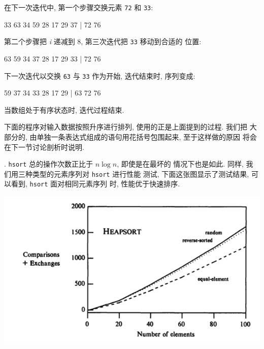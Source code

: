 在下一次迭代中, 第一个步骤交换元素 \texttt{72} 和 \texttt{33}:
\begin{file}
    33 63 34 59 28 17 29 37 | 72 76
\end{file}
第二个步骤把 \textit{i} 递减到 8, 第三次迭代把 \texttt{33} 移动到合适的 
位置:
\begin{file}
    63 59 34 37 28 17 29 33 | 72 76
\end{file}
下一次迭代以交换 \verb'63' 与 \verb'33' 作为开始, 迭代结束时, 序列变成:
\begin{file}
    59 37 34 33 28 17 29 | 63 72 76
\end{file}
当数组处于有序状态时, 迭代过程结束.

下面的程序对输入数据按照升序进行排列, 使用的正是上面提到的过程. 我们把 
大部分的, 由单独一条表达式组成的语句用花括号包围起来, 至于这样做的原因
将会在下一节讨论剖析时说明.

. \verb'hsort' 总的操作次数正比于 $n\log n$, 即使是在最坏的
情况下也是如此. 同样, 我们用三种类型的元素序列对 \verb'hsort' 进行性能
测试, 下面这张图显示了测试结果, 可以看到, \verb'hsort' 面对相同元素序列
时, 性能优于快速排序.
\begin{center}
    \includegraphics[scale=0.7]{images/heap_sort.png}
\end{center}

